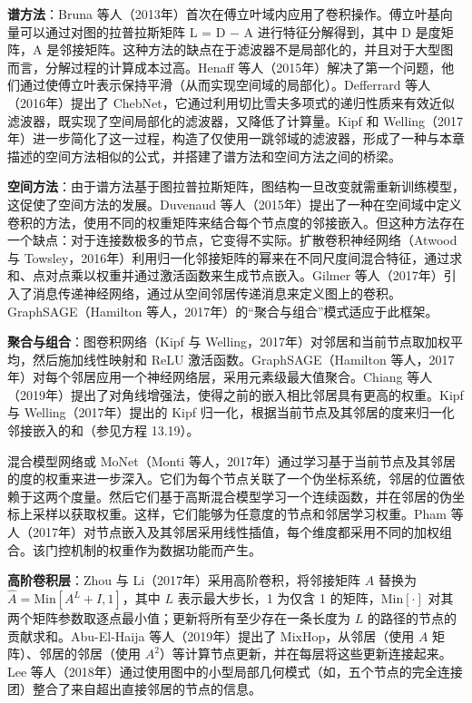 \textbf{谱方法}：Bruna 等人（2013年）首次在傅立叶域内应用了卷积操作。傅立叶基向量可以通过对图的拉普拉斯矩阵 L = D − A 进行特征分解得到，其中 D 是度矩阵，A 是邻接矩阵。这种方法的缺点在于滤波器不是局部化的，并且对于大型图而言，分解过程的计算成本过高。Henaff 等人（2015年）解决了第一个问题，他们通过使傅立叶表示保持平滑（从而实现空间域的局部化）。Defferrard 等人（2016年）提出了 ChebNet，它通过利用切比雪夫多项式的递归性质来有效近似滤波器，既实现了空间局部化的滤波器，又降低了计算量。Kipf 和 Welling（2017年）进一步简化了这一过程，构造了仅使用一跳邻域的滤波器，形成了一种与本章描述的空间方法相似的公式，并搭建了谱方法和空间方法之间的桥梁。

\textbf{空间方法}：由于谱方法基于图拉普拉斯矩阵，图结构一旦改变就需重新训练模型，这促使了空间方法的发展。Duvenaud 等人（2015年）提出了一种在空间域中定义卷积的方法，使用不同的权重矩阵来结合每个节点度的邻接嵌入。但这种方法存在一个缺点：对于连接数极多的节点，它变得不实际。扩散卷积神经网络（Atwood 与 Towsley，2016年）利用归一化邻接矩阵的幂来在不同尺度间混合特征，通过求和、点对点乘以权重并通过激活函数来生成节点嵌入。Gilmer 等人（2017年）引入了消息传递神经网络，通过从空间邻居传递消息来定义图上的卷积。GraphSAGE（Hamilton 等人，2017年）的“聚合与组合”模式适应于此框架。

\textbf{聚合与组合}：图卷积网络（Kipf 与 Welling，2017年）对邻居和当前节点取加权平均，然后施加线性映射和 ReLU 激活函数。GraphSAGE（Hamilton 等人，2017年）对每个邻居应用一个神经网络层，采用元素级最大值聚合。Chiang 等人（2019年）提出了对角线增强法，使得之前的嵌入相比邻居具有更高的权重。Kipf 与 Welling（2017年）提出的 Kipf 归一化，根据当前节点及其邻居的度来归一化邻接嵌入的和（参见方程 13.19）。

混合模型网络或 MoNet（Monti 等人，2017年）通过学习基于当前节点及其邻居的度的权重来进一步深入。它们为每个节点关联了一个伪坐标系统，邻居的位置依赖于这两个度量。然后它们基于高斯混合模型学习一个连续函数，并在邻居的伪坐标上采样以获取权重。这样，它们能够为任意度的节点和邻居学习权重。Pham 等人（2017年）对节点嵌入及其邻居采用线性插值，每个维度都采用不同的加权组合。该门控机制的权重作为数据功能而产生。

\textbf{高阶卷积层}：Zhou 与 Li（2017年）采用高阶卷积，将邻接矩阵 \(A\) 替换为 \(\hat{A} = \text{Min}[A^L + I, 1]\)，其中 \(L\) 表示最大步长，1 为仅含 1 的矩阵，\(\text{Min}[\cdot]\) 对其两个矩阵参数取逐点最小值；更新将所有至少存在一条长度为 \(L\) 的路径的节点的贡献求和。Abu-El-Haija 等人（2019年）提出了 \(\text{MixHop}\)，从邻居（使用 \(A\) 矩阵）、邻居的邻居（使用 \(A^2\)）等计算节点更新，并在每层将这些更新连接起来。Lee 等人（2018年）通过使用图中的小型局部几何模式（如，五个节点的完全连接团）整合了来自超出直接邻居的节点的信息。

